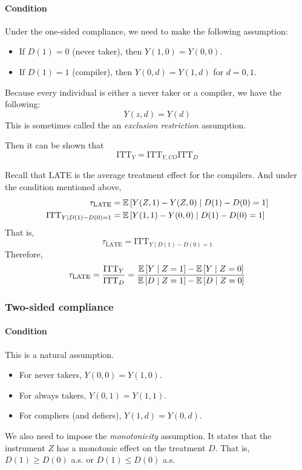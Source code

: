 \paragraph{Condition} Under the one-sided compliance, we need to make the following
assumption:
\begin{itemize}
    \item If $D(1)=0$ (never taker), then $Y(1,0)=Y(0,0)$.
    \item If $D(1)=1$ (compiler), then $Y(0,d)=Y(1,d)$ for $d=0,1$.
\end{itemize}
Because every individual is either a never taker or a compiler, we have the following:$$Y(z,d)=Y(d)$$ This is sometimes called the an \textit{exclusion restriction} assumption.

Then it can be shown that \begin{equation*}
    \text{ITT}_Y = \text{ITT}_{Y,CO}\text{ITT}_D
\end{equation*}

Recall that LATE is the average treatment effect for the compilers. And under
the condition mentioned above,
\begin{align*}
    \tau_{\text{LATE}}               & = \mathbb{E}\left[Y(Z,1)-Y(Z,0)\mid D(1)-D(0)=1\right] \\
    \text{ITT}_{Y\mid {D(1)-D(0)=1}} & =\mathbb{E}\left[Y(1,1)-Y(0,0)\mid D(1)-D(0)=1\right]
\end{align*}
That is, \begin{equation*}
    \tau_{\text{LATE}} = \text{ITT}_{Y\mid {D(1)-D(0)=1}}
\end{equation*}
Therefore,
\begin{equation*}
    \tau_{\text{LATE}} = \frac{\text{ITT}_Y}{\text{ITT}_D} =  \frac{\mathbb{E}\left[Y \mid Z=1\right]-\mathbb{E}\left[Y\mid Z=0\right]}{\mathbb{E}\left[D\mid Z=1\right]-\mathbb{E}\left[D\mid Z=0\right]}
\end{equation*}

\subsubsection{Two-sided compliance}
\paragraph{Condition} This is a natural assumption.
\begin{itemize}
    \item For never takers, $Y(0,0)=Y(1,0)$.
    \item For always takers, $Y(0,1)=Y(1,1)$.
    \item For compliers (and defiers), $Y(1,d)=Y(0,d)$.
\end{itemize}
We also need to impose the \emph{monotonicity} assumption. It states that the instrument $Z$ has a monotonic effect on the treatment $D$. That is, $D(1)\ge D(0)$ a.s. or $D(1)\le D(0)$ a.s.

